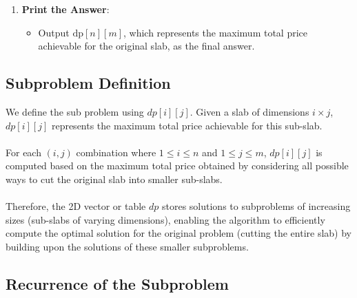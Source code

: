 \documentclass{article}
\begin{document}
{\begin{enumerate}
  \item \textbf{Print the Answer}:
    \begin{itemize}
      \item Output $\text{dp}[n][m]$, which represents the maximum total price achievable for the original slab, as the final answer.
    \end{itemize}
\end{enumerate}

\newpage

\subsection*{\Large{Subproblem Definition}}
We define the sub problem using $dp[i][j]$. Given a slab of dimensions $i \times j$, $dp[i][j]$ represents the maximum total price achievable for this sub-slab. 
\\\\
For each $(i, j)$ combination where $1 \leq i \leq n$ and $1 \leq j \leq m$, $dp[i][j]$ is computed based on the maximum total price obtained by considering all possible ways to cut the original slab into smaller sub-slabs.
\\\\
Therefore, the 2D vector or table $dp$ stores solutions to subproblems of increasing sizes (sub-slabs of varying dimensions), enabling the algorithm to efficiently compute the optimal solution for the original problem (cutting the entire slab) by building upon the solutions of these smaller subproblems.


\subsection*{\Large {Recurrence of the Subproblem}}




\fontsize{12}{15}}
\end{document}
